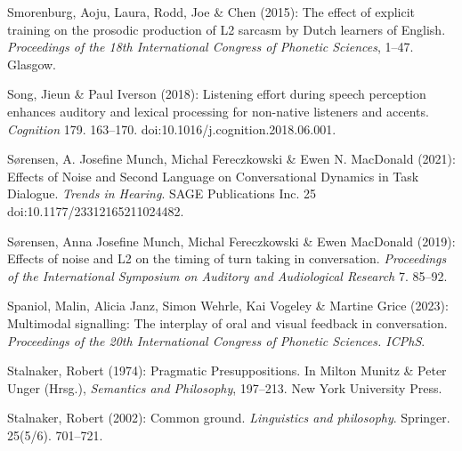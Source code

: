 \begin{styleBibliography}
Smorenburg, Aoju, Laura, Rodd, Joe \& Chen (2015): The effect of explicit training on the prosodic production of L2 sarcasm by Dutch learners of English. \textit{Proceedings of the 18th International Congress of Phonetic Sciences}, 1–47. Glasgow.
\end{styleBibliography}

\begin{styleBibliography}
Song, Jieun \& Paul Iverson (2018): Listening effort during speech perception enhances auditory and lexical processing for non-native listeners and accents. \textit{Cognition} 179. 163–170. doi:10.1016/j.cognition.2018.06.001.
\end{styleBibliography}

\begin{styleBibliography}
Sørensen, A. Josefine Munch, Michal Fereczkowski \& Ewen N. MacDonald (2021): Effects of Noise and Second Language on Conversational Dynamics in Task Dialogue. \textit{Trends in Hearing}. SAGE Publications Inc. 25 doi:10.1177/23312165211024482.
\end{styleBibliography}

\begin{styleBibliography}
Sørensen, Anna Josefine Munch, Michal Fereczkowski \& Ewen MacDonald (2019): Effects of noise and L2 on the timing of turn taking in conversation. \textit{Proceedings of the International Symposium on Auditory and Audiological Research} 7. 85–92.
\end{styleBibliography}

\begin{styleBibliography}
Spaniol, Malin, Alicia Janz, Simon Wehrle, Kai Vogeley \& Martine Grice (2023): Multimodal signalling: The interplay of oral and visual feedback in conversation. \textit{Proceedings of the 20th International Congress of Phonetic Sciences. ICPhS}.
\end{styleBibliography}

\begin{styleBibliography}
Stalnaker, Robert (1974): Pragmatic Presuppositions. In Milton Munitz \& Peter Unger (Hrsg.), \textit{Semantics and Philosophy}, 197–213. New York University Press.
\end{styleBibliography}

\begin{styleBibliography}
Stalnaker, Robert (2002): Common ground. \textit{Linguistics and philosophy}. Springer. 25(5/6). 701–721.
\end{styleBibliography}

